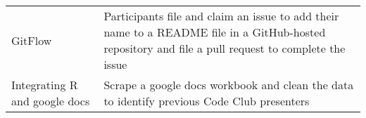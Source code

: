 \documentclass[
  11pt,
]{article}
\begin{document}
\begin{longtable}[]{@{}ll@{}}
\begin{minipage}[t]{0.25\columnwidth}\raggedright
GitFlow\strut
\end{minipage} & \begin{minipage}[t]{0.69\columnwidth}\raggedright
Participants file and claim an issue to add their name to a README file
in a GitHub-hosted repository and file a pull request to complete the
issue\strut
\end{minipage}\tabularnewline
\begin{minipage}[t]{0.25\columnwidth}\raggedright
Integrating R and google docs\strut
\end{minipage} & \begin{minipage}[t]{0.69\columnwidth}\raggedright
Scrape a google docs workbook and clean the data to identify previous
Code Club presenters\strut
\end{minipage}\tabularnewline
\bottomrule
\end{longtable}
\end{document}
